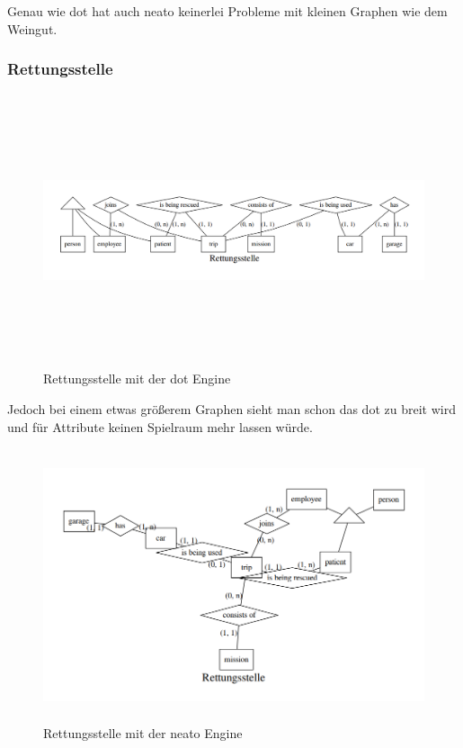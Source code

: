 \noindent
Genau wie dot hat auch neato keinerlei Probleme mit kleinen Graphen wie dem Weingut.

\subsubsection{Rettungsstelle}

\begin{figure}[H]
	\begin{center}
		\includegraphics[width=16cm, height=8cm]{images/rettungsstelle_dot.png}
		\caption{Rettungsstelle mit der dot Engine}
		\label{rs_dot}
	\end{center}
\end{figure}
\fib{}
\noindent
Jedoch bei einem etwas größerem Graphen sieht man schon das dot zu breit wird und für Attribute keinen Spielraum mehr lassen würde.

\begin{figure}[H]
	\begin{center}
		\includegraphics[width=16cm, height=8cm]{images/rettungsstelle_neato.png}
		\caption{Rettungsstelle mit der neato Engine}
		\label{rs_neato}
	\end{center}
\end{figure}

